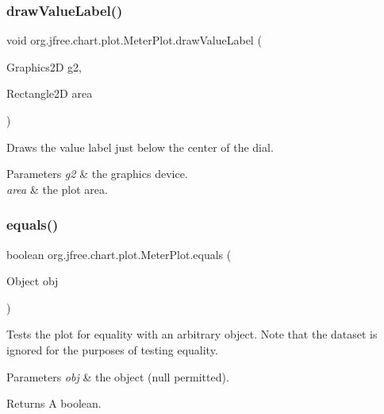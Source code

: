 \subsubsection{\texorpdfstring{draw\+Value\+Label()}{drawValueLabel()}}
{\footnotesize\ttfamily void org.\+jfree.\+chart.\+plot.\+Meter\+Plot.\+draw\+Value\+Label (\begin{DoxyParamCaption}\item[{Graphics2D}]{g2,  }\item[{Rectangle2D}]{area }\end{DoxyParamCaption})\hspace{0.3cm}{\ttfamily [protected]}}

Draws the value label just below the center of the dial.


\begin{DoxyParams}{Parameters}
{\em g2} & the graphics device. \\
\hline
{\em area} & the plot area. \\
\hline
\end{DoxyParams}
\mbox{\label{classorg_1_1jfree_1_1chart_1_1plot_1_1_meter_plot_aebe6822b690eb728fdce8fba69f19a2a}} 
\subsubsection{\texorpdfstring{equals()}{equals()}}
{\footnotesize\ttfamily boolean org.\+jfree.\+chart.\+plot.\+Meter\+Plot.\+equals (\begin{DoxyParamCaption}\item[{Object}]{obj }\end{DoxyParamCaption})}

Tests the plot for equality with an arbitrary object. Note that the dataset is ignored for the purposes of testing equality.


\begin{DoxyParams}{Parameters}
{\em obj} & the object ({\ttfamily null} permitted).\\
\hline
\end{DoxyParams}
\begin{DoxyReturn}{Returns}
A boolean. 
\end{DoxyReturn}
\mbox{\label{classorg_1_1jfree_1_1chart_1_1plot_1_1_meter_plot_aae9fcfe588d1bebae4d0f01fd42d38c0}} 
